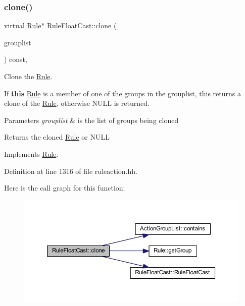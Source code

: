 \subsubsection{\texorpdfstring{clone()}{clone()}}
{\footnotesize\ttfamily virtual \mbox{\hyperlink{class_rule}{Rule}}$\ast$ Rule\+Float\+Cast\+::clone (\begin{DoxyParamCaption}\item[{const \mbox{\hyperlink{class_action_group_list}{Action\+Group\+List}} \&}]{grouplist }\end{DoxyParamCaption}) const\hspace{0.3cm}{\ttfamily [inline]}, {\ttfamily [virtual]}}



Clone the \mbox{\hyperlink{class_rule}{Rule}}. 

If {\bfseries{this}} \mbox{\hyperlink{class_rule}{Rule}} is a member of one of the groups in the grouplist, this returns a clone of the \mbox{\hyperlink{class_rule}{Rule}}, otherwise N\+U\+LL is returned. 
\begin{DoxyParams}{Parameters}
{\em grouplist} & is the list of groups being cloned \\
\hline
\end{DoxyParams}
\begin{DoxyReturn}{Returns}
the cloned \mbox{\hyperlink{class_rule}{Rule}} or N\+U\+LL 
\end{DoxyReturn}


Implements \mbox{\hyperlink{class_rule_a70de90a76461bfa7ea0b575ce3c11e4d}{Rule}}.



Definition at line 1316 of file ruleaction.\+hh.

Here is the call graph for this function\+:
\nopagebreak
\begin{figure}[H]
\begin{center}
\leavevmode
\includegraphics[width=350pt]{class_rule_float_cast_ad95f614c4d32b7ec4ce070dff4f4b0d1_cgraph}
\end{center}
\end{figure}
\mbox{\label{class_rule_float_cast_ae1aff01fafb453226d7e4e8a7bf7faaa}} 
